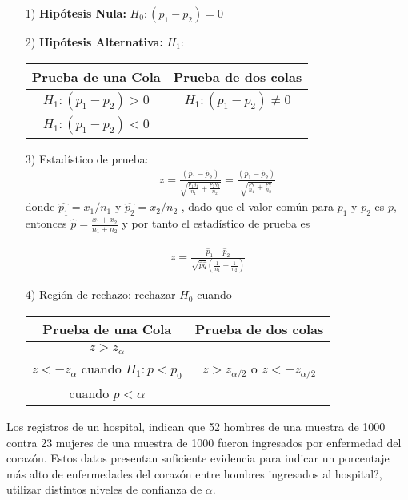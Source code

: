 \begin{frame}
\begin{frame}
\begin{itemize}
\item[1) ] \textbf{Hip\'otesis Nula:} $H_{0}:\left(p_{1}-p_{2}\right)=0$
\item[2) ] \textbf{Hip\'otesis Alternativa: } $H_{1}:$
\begin{tabular}{cc}\hline
\textbf{Prueba de una Cola} & \textbf{Prueba de dos colas}\\\hline
$H_{1}:\left(p_{1}-p_{2}\right)>0$ & $H_{1}:\left(p_{1}-p_{2}\right)\neq 0$\\ 
$H_{1}:\left(p_{1}-p_{2}\right)<0$&\\
\end{tabular}
\item[3) ] Estad\'istico de prueba:
\begin{eqnarray*}
z=\frac{\left(\hat{p}_{1}-\hat{p}_{2}\right)}{\sqrt{\frac{p_{1}q_{1}}{n_{1}}+\frac{p_{2}q_{2}}{n_{2}}}}=\frac{\left(\hat{p}_{1}-\hat{p}_{2}\right)}{\sqrt{\frac{pq}{n_{1}}+\frac{pq}{n_{2}}}}
\end{eqnarray*}
donde $\hat{p_{1}}=x_{1}/n_{1}$ y $\hat{p_{2}}=x_{2}/n_{2}$ , dado que el valor com\'un para $p_{1}$ y $p_{2}$ es $p$, entonces $\hat{p}=\frac{x_{1}+x_{2}}{n_{1}+n_{2}}$ y por tanto el estad\'istico de prueba es
\end{itemize}








\begin{eqnarray*}
z=\frac{\hat{p}_{1}-\hat{p}_{2}}{\sqrt{\hat{p}\hat{q}}\left(\frac{1}{n_{1}}+\frac{1}{n_{2}}\right)}
\end{eqnarray*}
\begin{itemize}
\item[4) ] Regi\'on de rechazo: rechazar $H_{0}$ cuando
\begin{tabular}{cc}\hline
\textbf{Prueba de una Cola} & \textbf{Prueba de dos colas}\\\hline
$z>z_{\alpha}$ & \\
$z<-z_{\alpha}$ cuando $H_{1}:p<p_{0}$&$z>z_{\alpha/2}$ o $z<-z_{\alpha/2}$\\
 cuando $p<\alpha$&\\
\end{tabular}

\end{itemize}








\begin{Ejem}
Los registros de un hospital, indican que 52 hombres de una muestra de 1000 contra 23 mujeres de una muestra de 1000 fueron ingresados por enfermedad del coraz\'on. Estos datos presentan suficiente evidencia para indicar un porcentaje m\'as alto de enfermedades del coraz\'on entre hombres ingresados al hospital?, utilizar distintos niveles de confianza de $\alpha$.


\end{Ejem}
\end{frame}
\end{frame}
